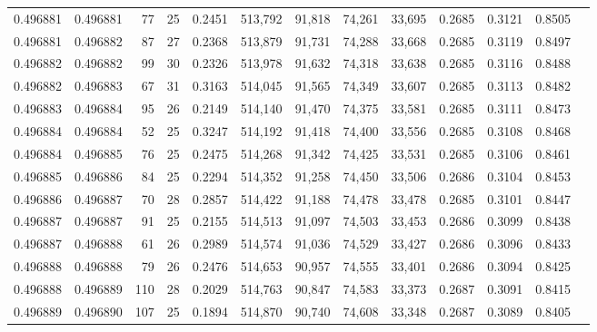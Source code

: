 \begin{tabular}{rrrrrrrrrrrrr}
0.496881 & 0.496881 &  77 &  25 &                                     0.2451 & 513,792 &  91,818 &  74,261 &  33,695 & 0.2685 & 0.3121 & 0.8505 \\
0.496881 & 0.496882 &  87 &  27 &                                     0.2368 & 513,879 &  91,731 &  74,288 &  33,668 & 0.2685 & 0.3119 & 0.8497 \\
0.496882 & 0.496882 &  99 &  30 &                                     0.2326 & 513,978 &  91,632 &  74,318 &  33,638 & 0.2685 & 0.3116 & 0.8488 \\
0.496882 & 0.496883 &  67 &  31 &                                     0.3163 & 514,045 &  91,565 &  74,349 &  33,607 & 0.2685 & 0.3113 & 0.8482 \\
0.496883 & 0.496884 &  95 &  26 &                                     0.2149 & 514,140 &  91,470 &  74,375 &  33,581 & 0.2685 & 0.3111 & 0.8473 \\
0.496884 & 0.496884 &  52 &  25 &                                     0.3247 & 514,192 &  91,418 &  74,400 &  33,556 & 0.2685 & 0.3108 & 0.8468 \\
0.496884 & 0.496885 &  76 &  25 &                                     0.2475 & 514,268 &  91,342 &  74,425 &  33,531 & 0.2685 & 0.3106 & 0.8461 \\
0.496885 & 0.496886 &  84 &  25 &                                     0.2294 & 514,352 &  91,258 &  74,450 &  33,506 & 0.2686 & 0.3104 & 0.8453 \\
0.496886 & 0.496887 &  70 &  28 &                                     0.2857 & 514,422 &  91,188 &  74,478 &  33,478 & 0.2685 & 0.3101 & 0.8447 \\
0.496887 & 0.496887 &  91 &  25 &                                     0.2155 & 514,513 &  91,097 &  74,503 &  33,453 & 0.2686 & 0.3099 & 0.8438 \\
0.496887 & 0.496888 &  61 &  26 &                                     0.2989 & 514,574 &  91,036 &  74,529 &  33,427 & 0.2686 & 0.3096 & 0.8433 \\
0.496888 & 0.496888 &  79 &  26 &                                     0.2476 & 514,653 &  90,957 &  74,555 &  33,401 & 0.2686 & 0.3094 & 0.8425 \\
0.496888 & 0.496889 & 110 &  28 &                                     0.2029 & 514,763 &  90,847 &  74,583 &  33,373 & 0.2687 & 0.3091 & 0.8415 \\
0.496889 & 0.496890 & 107 &  25 &                                     0.1894 & 514,870 &  90,740 &  74,608 &  33,348 & 0.2687 & 0.3089 & 0.8405 \\

\end{tabular}
